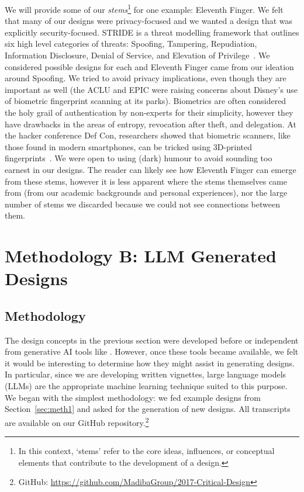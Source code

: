 We will provide some of our \textit{stems}\footnote{In this context, `stems' refer to the core ideas, influences, or conceptual elements that contribute to the development of a design.} for one example: Eleventh Finger.  We felt that many of our designs were privacy-focused and we wanted a design that was explicitly security-focused. STRIDE is a threat modelling framework that outlines six high level categories of threats: Spoofing, Tampering, Repudiation, Information Disclosure, Denial of Service, and Elevation of Privilege~\cite{shostack2014threat}. We considered possible designs for each and Eleventh Finger came from our ideation around Spoofing. We tried to avoid privacy implications, even though they are important as well (the ACLU and EPIC were raising concerns about Disney's use of biometric fingerprint scanning at its parks). Biometrics are often considered the holy grail of authentication by non-experts for their simplicity, however they have drawbacks in the areas of entropy, revocation after theft, and delegation. At the hacker conference Def Con, researchers showed that biometric scanners, like those found in modern smartphones, can be tricked using 3D-printed fingerprints~\cite{levalle2020biometric}. We were open to using (dark) humour to avoid sounding too earnest in our designs. The reader can likely see how Eleventh Finger can emerge from these stems, however it is less apparent where the stems themselves came from (\eg from our academic backgrounds and personal experiences), nor the large number of stems we discarded because we could not see connections between them. 


\section{Methodology B: LLM Generated Designs}
\label{sec:meth2}

\subsection{Methodology}

The design concepts in the previous section were developed before or independent from generative AI tools like \gpt. However, once these tools became available, we felt it would be interesting to determine how they might assist in generating designs. In particular, since we are developing written vignettes, large language models (LLMs) are the appropriate machine learning technique suited to this purpose. We began with the simplest methodology: we fed \gpt \gptv example designs from Section~\ref{sec:meth1} and asked for the generation of new designs. All transcripts are available on our GitHub repository.\footnote{GitHub: \url{https://github.com/MadibaGroup/2017-Critical-Design}}

